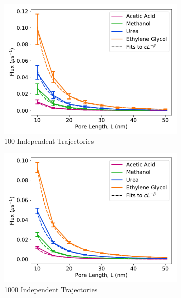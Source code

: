\documentclass{article}
\begin{document}
  \begin{figure}
  \centering
  \begin{subfigure}{0.45\textwidth}
  \includegraphics[width=\textwidth]{flux_curves_N100.pdf}
  \caption{100 Independent Trajectories}\label{fig:N100}
  \end{subfigure}
  \begin{subfigure}{0.45\textwidth}
  \includegraphics[width=\textwidth]{flux_curves_N1000.pdf}
  \caption{1000 Independent Trajectories}\label{fig:N1000}
  \end{subfigure}
  \begin{subfigure}{0.45\textwidth}

\end{subfigure}
\end{figure}
\end{document}
